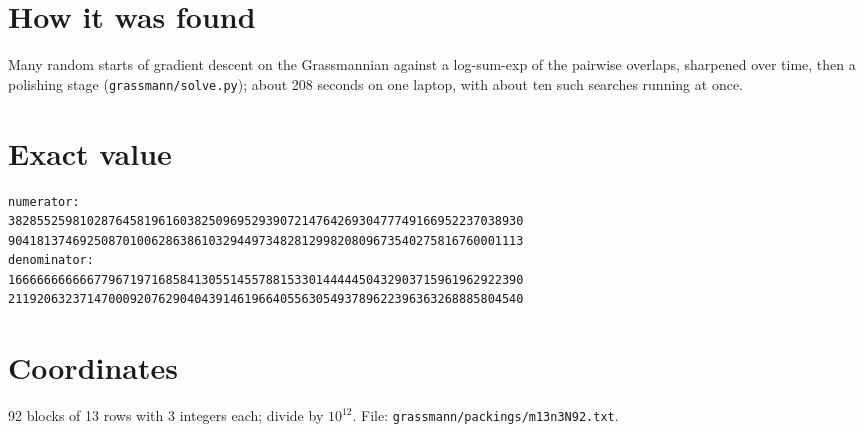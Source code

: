 \documentclass[11pt,a4paper]{article}
\begin{document}
\section{How it was found}
Many random starts of gradient descent on the Grassmannian against a log-sum-exp of the pairwise overlaps, sharpened over time, then a polishing stage (\texttt{grassmann/solve.py}); about 208 seconds on one laptop, with about ten such searches running at once.


\appendix
\section{Exact value}
{\small
\begin{verbatim}
numerator:
382855259810287645819616038250969529390721476426930477749166952237038930
904181374692508701006286386103294497348281299820809673540275816760001113
denominator:
166666666666779671971685841305514557881533014444450432903715961962922390
211920632371470009207629040439146196640556305493789622396363268885804540
\end{verbatim}}

\section{Coordinates}
92 blocks of 13 rows with 3 integers each; divide by $10^{12}$. File: \texttt{grassmann/packings/m13n3N92.txt}.
{\tiny
\begin{multicols}{3}
\end{multicols}}
\end{document}
